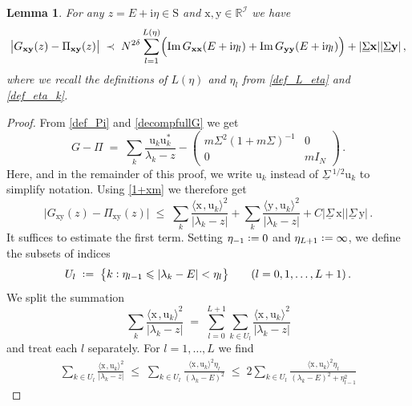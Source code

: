 \documentclass[11pt]{article} %
\numberwithin{equation}{section}
\numberwithin{figure}{section}
\theoremstyle{plain} %
\newtheorem{lemma}[theorem]{Lemma}
\theoremstyle{definition} %
\newcommand{\f}[1]{\boldsymbol{\mathrm{#1}}} %
\renewcommand{\cal}{\mathcal}
\newcommand{\ul}[1]{\underline{#1} \!\,} %
\newcommand{\R}{\mathbb{R}}
\newcommand{\ii}{\mathrm{i}}
\newcommand{\col}{\mathrel{\vcenter{\baselineskip0.75ex \lineskiplimit0pt \hbox{.}\hbox{.}}}}
\newcommand*{\deq}{\mathrel{\vcenter{\baselineskip0.65ex \lineskiplimit0pt \hbox{.}\hbox{.}}}=}
\renewcommand{\leq}{\leqslant}
\newcommand{\pB}[1]{\Bigl({#1}\Bigr)}
\newcommand{\hb}[1]{\bigl\{{#1}\bigr\}}
\newcommand{\abs}[1]{\lvert #1 \rvert}
\newcommand{\absb}[1]{\bigl\lvert #1 \bigr\rvert}
\newcommand{\scalar}[2]{\langle{#1} \mspace{2mu}, {#2}\rangle}
\DeclareMathOperator{\im}{Im}
\begin{document}
\begin{lemma} \label{lem:rough_bound}
For any $z  = E + \ii \eta\in \f S$ and $\f x, \f y \in \R^{\cal I}$ we have
\begin{equation*}
\absb{G_{\f x \f y}(z) - \Pi_{\f x \f y}(z)} \;\prec\; N^{2 \delta} \sum_{l = 1}^{L(\eta)} \pB{\im G_{\f x \f x}(E + \ii \eta_l) + \im G_{\f y \f y}( E + \ii \eta_l)} + \abs{\ul \Sigma \f x} \abs{\ul \Sigma \f y}\,,
\end{equation*}
where we recall the definitions of $L(\eta)$ and $\eta_l$ from \eqref{def_L_eta} and \eqref{def_eta_k}.
\end{lemma}

\begin{proof}
From \eqref{def_Pi} and \eqref{decompfullG} we get
\begin{equation*}
G - \Pi \;=\; \sum_{k} \frac{\f u_k \f u_k^*}{\lambda_k - z} -
\begin{pmatrix}
m \Sigma^2 (1 + m \Sigma)^{-1} & 0
\\
0 & m I_N
\end{pmatrix}\,.
\end{equation*}
Here, and in the remainder of this proof, we write $\f u_k$ instead of $\ul \Sigma^{1/2} \f u_k$ to simplify notation.
Using \eqref{1+xm} we therefore get
\begin{equation*}
\absb{G_{\f x \f y}(z) - \Pi_{\f x \f y}(z)} \;\leq\; \sum_{k} \frac{\scalar{\f x}{\f u_k}^2}{\abs{\lambda_k - z}} + \sum_{k} \frac{\scalar{\f y}{\f u_k}^2}{\abs{\lambda_k - z}}
+ C \abs{\ul \Sigma \f x} \abs{\ul \Sigma \f y}\,.
\end{equation*}
It suffices to estimate the first term. Setting $\eta_{-1} \deq 0$ and $\eta_{L + 1} \deq \infty$, we define the subsets of indices
\begin{equation*}
U_l \;\deq\; \hb{k \col \eta_{l - 1} \leq \abs{\lambda_k - E} < \eta_l} \qquad (l = 0,1, \dots, L+1)\,.
\end{equation*}
We split the summation
\begin{equation*}
\sum_{k} \frac{\scalar{\f x}{\f u_k}^2}{\abs{\lambda_k - z}} \;=\; \sum_{l = 0}^{L + 1} \sum_{k \in U_l} \frac{\scalar{\f x}{\f u_k}^2}{\abs{\lambda_k - z}}
\end{equation*}
and treat each $l$ separately. For $l = 1, \dots, L$ we find
\begin{multline*}
\sum_{k \in U_l} \frac{\scalar{\f x}{\f u_k}^2}{\abs{\lambda_k - z}} \;\leq\; \sum_{k \in U_l} \frac{\scalar{\f x}{\f u_k}^2 \eta_l}{(\lambda_k - E)^2} \;\leq\; 2 \sum_{k \in U_l} \frac{\scalar{\f x}{\f u_k}^2 \eta_l}{(\lambda_k - E)^2 + \eta_{l - 1}^2} 

\end{multline*}
\end{proof}
\end{document}
